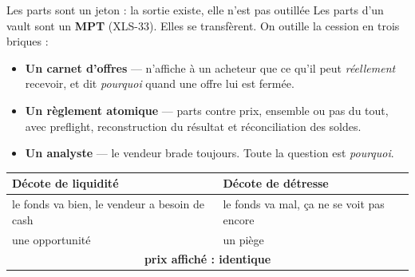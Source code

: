 \documentclass[aspectratio=169,11pt]{beamer}
\begin{document}
\begin{frame}{Les parts sont un jeton : la sortie existe, elle n'est pas outillée}
\vspace{6pt}
Les parts d'un vault sont un \textbf{MPT} (XLS-33). Elles se transfèrent. On outille
la cession en trois briques :
\vspace{8pt}
\begin{itemize}
\setlength\itemsep{7pt}
\item \textbf{Un carnet d'offres} --- n'affiche à un acheteur que ce qu'il peut
      \emph{réellement} recevoir, et dit \emph{pourquoi} quand une offre lui est fermée.
\item \textbf{Un règlement atomique} --- parts contre prix, ensemble ou pas du tout,
      avec preflight, reconstruction du résultat et réconciliation des soldes.
\item \textbf{Un analyste} --- le vendeur brade toujours. Toute la question est
      \emph{pourquoi}.
\end{itemize}
\vspace{10pt}

\begin{center}
\begin{tabular}{@{}ll@{}}
\toprule
\color{good}\textbf{Décote de liquidité} & \color{bad}\textbf{Décote de détresse}\\
\midrule
le fonds va bien, le vendeur a besoin de cash & le fonds va mal, ça ne se voit pas encore\\
\color{good}une opportunité & \color{bad}un piège\\
\multicolumn{2}{c}{\textbf{prix affiché : identique}}\\
\bottomrule
\end{tabular}
\end{center}
\end{frame}
\end{document}
